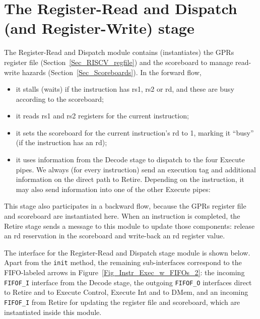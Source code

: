 
\section{The Register-Read and Dispatch (and Register-Write) stage}

\label{Sec_Fife_RR_RW_stage}

The Register-Read and Dispatch module contains (instantiates) the GPRs
register file (Section~\ref{Sec_RISCV_regfile}) and the scoreboard to
manage read-write hazards (Section~\ref{Sec_Scoreboards}).  In the
forward flow,

\begin{itemize}

  \item it stalls (waits) if the instruction has rs1, rs2 or rd, and
        these are busy according to the scoreboard;

  \item it reads rs1 and rs2 registers for the current instruction;

  \item it sets the scoreboard for the current instruction's rd to 1,
        marking it ``busy'' (if the instruction has an rd);

  \item it uses information from the Decode stage to dispatch to the
        four Execute pipes.  We always (for every instruction) send an
        execution tag and additional information on the direct path to
        Retire.  Depending on the instruction, it may also send
        information into one of the other Execute pipes:


\end{itemize}

This stage also participates in a backward flow, because the GPRs
register file and scoreboard are instantiated here.  When an
instruction is completed, the Retire stage sends a message to this
module to update those components: release an rd reservation in the
scoreboard and write-back an rd register value.

The interface for the Register-Read and Dispatch stage module is shown
below.  Apart from the \verb|init| method, the remaining
sub-interfaces correspond to the FIFO-labeled arrows in
Figure~\ref{Fig_Instr_Exec_w_FIFOs_2}: the incoming \verb|FIFOF_I|
interface from the Decode stage, the outgoing \verb|FIFOF_O|
interfaces direct to Retire and to Execute Control, Execute Int and to
DMem, and an incoming \verb|FIFOF_I| from Retire for updating the
register file and scoreboard, which are instantiated inside this
module.

